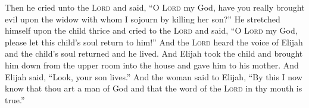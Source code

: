 \begin{enumerate}
     Then he cried unto the \textsc{Lord} and said, ``O \textsc{Lord} my God, have you really brought evil upon the widow with whom I sojourn by killing her son?''%
     He stretched himself upon the child thrice and cried to the \textsc{Lord} and said, ``O \textsc{Lord} my God, please let this child's soul return to him!''%
     And the \textsc{Lord} heard the voice of Elijah and the child's soul returned and he lived.%
     And Elijah took the child and brought him down from the upper room into the house and gave him to his mother. And Elijah said, ``Look, your son lives.''%
     And the woman said to Elijah, ``By this I now know that thou art a man of God and that the word of the \textsc{Lord} in thy mouth is true.''%
\end{enumerate}
